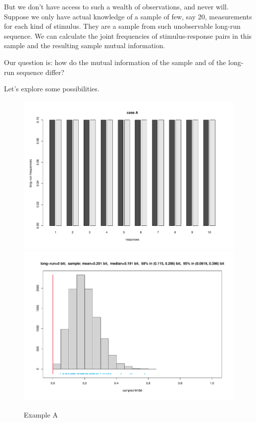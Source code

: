 \documentclass[\ifafour a4paper,12pt,\else a5paper,10pt,\fi%
onecolumn,oneside,article,%
british%
]{memoir}
\theoremstyle{remark}
\theoremstyle{innote}
\renewcommand*{\|}[1][]{\nonscript\,#1\vert\nonscript\;\mathopen{}}
\begin{document}
But we don't have access to such a wealth of observations, and never will.
Suppose we only have actual knowledge of a sample of few, say 20,
measurements for each kind of stimulus. They are a sample from such
unobservable long-run sequence. We can calculate the joint frequencies of
stimulus-response pairs in this sample and the resulting sample mutual
information.

Our question is: how do the mutual information of the sample and of the
long-run sequence differ?

Let's explore some possibilities.

\clearpage

\begin{figure}[p]%
\centering\includegraphics[width=\linewidth]{scripts/resp_caseA.pdf}\\%
\includegraphics[width=\linewidth]{scripts/histo_caseA.pdf}\\
\caption{Example A}\label{fig:resp_caseA}
\end{figure}%
\end{document}

